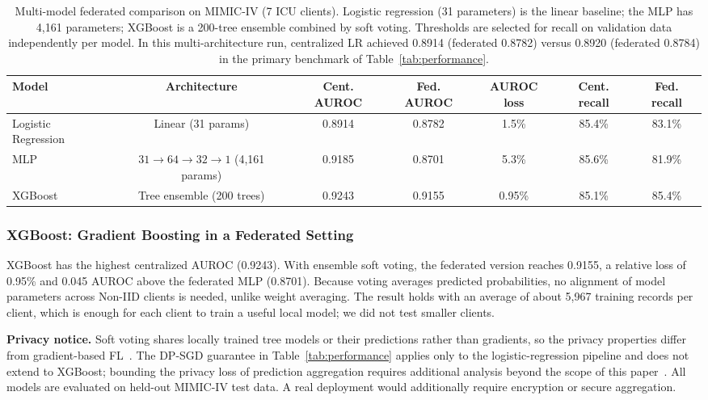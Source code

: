 \documentclass[journal]{IEEEtran}
\begin{document}
\begin{table}[t]
\caption{Multi-model federated comparison on MIMIC-IV (7 ICU clients). Logistic regression (31 parameters) is the linear baseline; the MLP has 4,161 parameters; XGBoost is a 200-tree ensemble combined by soft voting. Thresholds are selected for recall on validation data independently per model. In this multi-architecture run, centralized LR achieved 0.8914 (federated 0.8782) versus 0.8920 (federated 0.8784) in the primary benchmark of Table~\ref{tab:performance}.}
\centering
\small
\begin{tabular}{lcccccc}
\toprule
\textbf{Model} & \textbf{Architecture} & \textbf{Cent. AUROC} & \textbf{Fed. AUROC} & \textbf{AUROC loss} & \textbf{Cent. recall} & \textbf{Fed. recall} \\
\midrule
Logistic Regression & Linear (31 params) & 0.8914 & 0.8782 & 1.5\% & 85.4\% & 83.1\% \\
MLP & $31{\to}64{\to}32{\to}1$ (4,161 params) & 0.9185 & 0.8701 & 5.3\% & 85.6\% & 81.9\% \\
XGBoost & Tree ensemble (200 trees) & 0.9243 & 0.9155 & 0.95\% & 85.1\% & 85.4\% \\
\bottomrule
\end{tabular}
\label{tab:multimodel_comparison}
\end{table}

\subsubsection{XGBoost: Gradient Boosting in a Federated Setting}
XGBoost has the highest centralized AUROC (0.9243). With ensemble soft voting, the federated version reaches 0.9155, a relative loss of 0.95\% and 0.045 AUROC above the federated MLP (0.8701). Because voting averages predicted probabilities, no alignment of model parameters across Non-IID clients is needed, unlike weight averaging. The result holds with an average of about 5,967 training records per client, which is enough for each client to train a useful local model; we did not test smaller clients.

\textbf{Privacy notice.} Soft voting shares locally trained tree models or their predictions rather than gradients, so the privacy properties differ from gradient-based FL~\cite{zhu2019deep}. The DP-SGD guarantee in Table~\ref{tab:performance} applies only to the logistic-regression pipeline and does not extend to XGBoost; bounding the privacy loss of prediction aggregation requires additional analysis beyond the scope of this paper~\cite{shokri2016membership}. All models are evaluated on held-out MIMIC-IV test data. A real deployment would additionally require encryption or secure aggregation.
\end{document}
